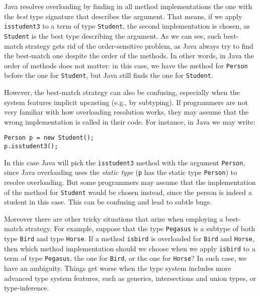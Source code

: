 \noindent Java resolves overloading by finding in all method implementations the one with
the \textit{best} type signature that describes the argument. That means, if we
apply \lstinline{isstudent3} to a term of type \lstinline{Student}, the second
implementation is chosen, as \lstinline{Student} is the best type describing the
argument. As we can see, such best-match strategy gets rid of the
order-sensitive problem, as Java always try to find the best-match one despite
the order of the methods. In other words, in Java the order of methods does not matter:
in this case,
we have the method for \lstinline{Person} before the one for \lstinline{Student}, but Java still finds
the one for \lstinline{Student}.

However, the best-match strategy can also be confusing, especially when the
system features implicit upcasting (e.g., by subtyping). If programmers
are not very familiar with how overloading resolution works, they may assume
that the wrong implementation is called in their code. For instance, in Java
we may write:

\begin{lstlisting}
Person p = new Student();
p.isstudent3();
\end{lstlisting}

\noindent In this case Java will pick the \lstinline{isstudent3} method with the
argument \lstinline{Person}, since Java overloading uses the \emph{static type}
(\lstinline{p} has the static type \lstinline{Person})
to resolve overloading. But some programmers may assume that the implementation
of the method for \lstinline{Student} would be chosen instead, since the person
is indeed a student in this case. This can be confusing and lead to subtle bugs.

Moreover there are other tricky situations
that arize when employing a best-match strategy. For example, suppose
that the type \lstinline{Pegasus} is a subtype of both type \lstinline{Bird} and type
\lstinline{Horse}. If a method \lstinline{isbird} is overloaded for
\lstinline{Bird} and \lstinline{Horse}, then which method implementation should
we choose when we apply \lstinline{isbird} to a term of type
\lstinline{Pegasus}, the one for \lstinline{Bird}, or the one for
\lstinline{Horse}? In such case, we have an ambiguity. Things get worse
when the type system includes more advanced type system features, such as generics,
intersections and union types,
or type-inference.




